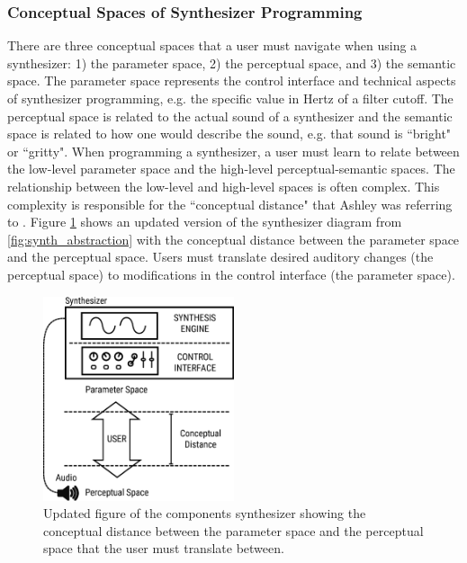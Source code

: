 \subsubsection{Conceptual Spaces of Synthesizer Programming}
There are three conceptual spaces that a user must navigate when using a synthesizer: 1) the parameter space, 2) the perceptual space, and 3) the semantic space. The parameter space represents the control interface and technical aspects of synthesizer programming, e.g. the specific value in Hertz of a filter cutoff. The perceptual space is related to the actual sound of a synthesizer and the semantic space is related to how one would describe the sound, e.g. that sound is ``bright" or ``gritty". When programming a synthesizer, a user must learn to relate between the low-level parameter space and the high-level perceptual-semantic spaces. The relationship between the low-level and high-level spaces is often complex. This complexity is responsible for the ``conceptual distance" that Ashley was referring to \cite{ashley1986knowledge}. Figure \ref{fig:synth_conceptual_dist} shows an updated version of the synthesizer diagram from \ref{fig:synth_abstraction} with the conceptual distance between the parameter space and the perceptual space. Users must translate desired auditory changes (the perceptual space) to modifications in the control interface (the parameter space).

\begin{figure}[ht]
    \centering
    \includegraphics[width=0.5\textwidth]{figures/background/synth_conceptual_dist.eps}
    \caption{Updated figure of the components synthesizer showing the conceptual distance between the parameter space and the perceptual space that the user must translate between.}
    \label{fig:synth_conceptual_dist}
\end{figure}

